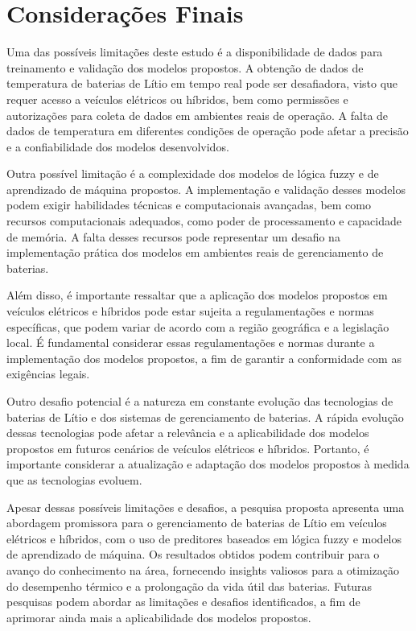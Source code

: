 \section{Considerações Finais}
Uma das possíveis limitações deste estudo é a disponibilidade de dados para treinamento e validação dos modelos propostos. A obtenção de dados de temperatura de baterias de Lítio em tempo real pode ser desafiadora, visto que requer acesso a veículos elétricos ou híbridos, bem como permissões e autorizações para coleta de dados em ambientes reais de operação. A falta de dados de temperatura em diferentes condições de operação pode afetar a precisão e a confiabilidade dos modelos desenvolvidos.

Outra possível limitação é a complexidade dos modelos de lógica fuzzy e de aprendizado de máquina propostos. A implementação e validação desses modelos podem exigir habilidades técnicas e computacionais avançadas, bem como recursos computacionais adequados, como poder de processamento e capacidade de memória. A falta desses recursos pode representar um desafio na implementação prática dos modelos em ambientes reais de gerenciamento de baterias.

Além disso, é importante ressaltar que a aplicação dos modelos propostos em veículos elétricos e híbridos pode estar sujeita a regulamentações e normas específicas, que podem variar de acordo com a região geográfica e a legislação local. É fundamental considerar essas regulamentações e normas durante a implementação dos modelos propostos, a fim de garantir a conformidade com as exigências legais.

Outro desafio potencial é a natureza em constante evolução das tecnologias de baterias de Lítio e dos sistemas de gerenciamento de baterias. A rápida evolução dessas tecnologias pode afetar a relevância e a aplicabilidade dos modelos propostos em futuros cenários de veículos elétricos e híbridos. Portanto, é importante considerar a atualização e adaptação dos modelos propostos à medida que as tecnologias evoluem.

Apesar dessas possíveis limitações e desafios, a pesquisa proposta apresenta uma abordagem promissora para o gerenciamento de baterias de Lítio em veículos elétricos e híbridos, com o uso de preditores baseados em lógica fuzzy e modelos de aprendizado de máquina. Os resultados obtidos podem contribuir para o avanço do conhecimento na área, fornecendo insights valiosos para a otimização do desempenho térmico e a prolongação da vida útil das baterias. Futuras pesquisas podem abordar as limitações e desafios identificados, a fim de aprimorar ainda mais a aplicabilidade dos modelos propostos.